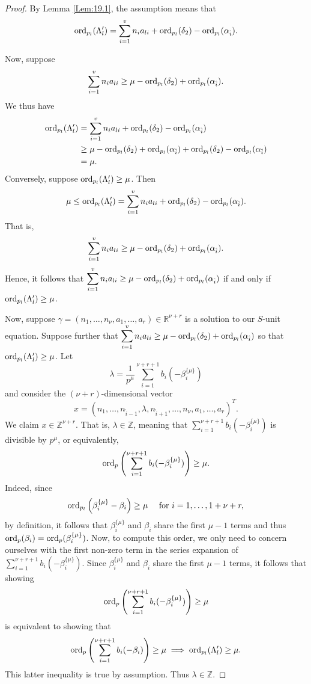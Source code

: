 \begin{proof}
By Lemma \ref{Lem:19.1}, the assumption means that 
\[\operatorname{ord}_{p_l}(\Lambda_l') = \sum_{i = 1}^v n_{i}a_{li} + \operatorname{ord}_{p_l}(\delta_2) - \operatorname{ord}_{p_l}(\alpha_{\hat{i}}).\]

Now, suppose 
\[\sum_{i = 1}^v n_{i}a_{li}  \geq \mu - \operatorname{ord}_{p_l}(\delta_2) + \operatorname{ord}_{p_l}(\alpha_{\hat{i}}).\]
We thus have
\begin{align*}
\operatorname{ord}_{p_l}(\Lambda_l')	
	& = \sum_{i = 1}^v n_{i}a_{li} + \operatorname{ord}_{p_l}(\delta_2) - \operatorname{ord}_{p_l}(\alpha_{\hat{i}})\\
	& \geq  \mu - \operatorname{ord}_{p_l}(\delta_2) + \operatorname{ord}_{p_l}(\alpha_{\hat{i}}) + \operatorname{ord}_{p_l}(\delta_2) - \operatorname{ord}_{p_l}(\alpha_{\hat{i}})\\	
	& = \mu.
\end{align*}
Conversely, suppose $\operatorname{ord}_{p_l}(\Lambda_l') \geq \mu$. Then
\[\mu \leq \operatorname{ord}_{p_l}(\Lambda_l') = \sum_{i = 1}^v n_{i}a_{li} + \operatorname{ord}_{p_l}(\delta_2) - \operatorname{ord}_{p_l}(\alpha_{\hat{i}}).\]
That is, 
\[\sum_{i = 1}^v n_{i}a_{li} \geq \mu - \operatorname{ord}_{p_l}(\delta_2) + \operatorname{ord}_{p_l}(\alpha_{\hat{i}}).\]
Hence, it follows that $\displaystyle \sum_{i = 1}^v n_{i}a_{li} \geq \mu - \operatorname{ord}_{p_l}(\delta_2) + \operatorname{ord}_{p_l}(\alpha_{\hat{i}})$ if and only if $\operatorname{ord}_{p_l}(\Lambda_l') \geq \mu$.

Now, suppose $\gamma = (n_1, \dots, n_{\nu}, a_1, \dots, a_r) \in \mathbb{R}^{\nu + r}$ is a solution to our $S$-unit equation. Suppose further that $\displaystyle \sum_{i = 1}^v n_{i}a_{li} \geq \mu - \operatorname{ord}_{p_l}(\delta_2) + \operatorname{ord}_{p_l}(\alpha_{\hat{i}})$ so that $\operatorname{ord}_{p_l}(\Lambda_l') \geq \mu$. Let
\[\lambda = \frac{1}{p^{\mu}}\sum_{i = 1}^{\nu + r + 1}b_i(-\beta_i^{\{\mu\}})\]
and consider the $(\nu + r)$-dimensional vector
\[x= (n_1, \dots, n_{\hat{i} -1}, \lambda, n_{\hat{i} +1}, \dots, n_{\nu}, a_1, \dots, a_r)^T.\]
We claim $x \in \mathbb{Z}^{\nu + r}$. That is, $\lambda \in \mathbb{Z}$, meaning that $\sum_{i = 1}^{\nu + r + 1}b_i(-\beta_i^{\{\mu\}})$ is divisible by $p^{\mu}$, or equivalently, 
\[\operatorname{ord}_p\left(\sum_{i = 1}^{\nu + r + 1}b_i(-\beta_i^{\{\mu\}})\right) \geq \mu.\]
Indeed, since 
\[\operatorname{ord}_{p_{l}}\left(\beta_{i}^{\{\mu\}}-\beta_{i}\right) \geq \mu \quad \text { for } i=1, \dots, 1+\nu+r,\]
by definition, it follows that $\beta_{i}^{\{\mu\}}$ and $\beta_{i}$ share the first $\mu - 1$ terms and thus $\operatorname{ord}_p(\beta_i) = \operatorname{ord}_p(\beta_i^{\{\mu\}})$.
Now, to compute this order, we only need to concern ourselves with the first non-zero term in the series expansion of $\sum_{i = 1}^{\nu + r + 1}b_i(-\beta_i^{\{\mu\}})$. Since $\beta_{i}^{\{\mu\}}$ and $\beta_{i}$ share the first $\mu - 1$ terms, it follows that showing
\[\operatorname{ord}_p\left(\sum_{i = 1}^{\nu + r + 1}b_i(-\beta_i^{\{\mu\}})\right) \geq \mu\]
is equivalent to showing that 
\[\operatorname{ord}_p\left(\sum_{i = 1}^{\nu + r + 1}b_i(-\beta_i)\right) \geq \mu \implies \operatorname{ord}_{p_l}(\Lambda_l') \geq \mu.\]
This latter inequality is true by assumption. Thus $\lambda \in \mathbb{Z}$. 


\end{proof}
